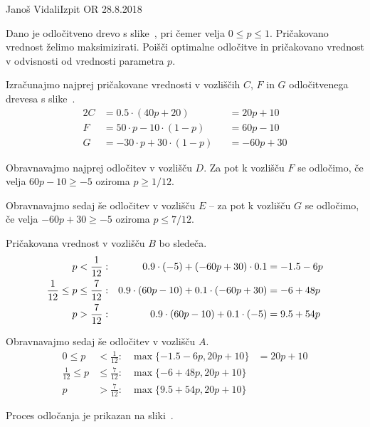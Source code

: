 \begin{naloga}{Janoš Vidali}{Izpit OR 28.8.2018}
\begin{vprasanje}
Dano je odločitveno drevo s slike~\fig,
pri čemer velja $0 \le p \le 1$.
Pričakovano vred\-nost želimo maksimizirati.
Poišči optimalne odločitve in pričakovano vrednost
v odvisnosti od vrednosti parametra $p$.

\begin{slika}
\pgfslika
{}
\end{slika}
\end{vprasanje}

\begin{odgovor}
Izračunajmo najprej pričakovane vrednosti v vozliščih $C$, $F$ in $G$
odločitvenega drevesa s slike~\fig.
\begin{alignat*}{2}
C &= 0.5 \cdot (40 p + 20) &&= 20p + 10 \\
F &= 50 \cdot p - 10 \cdot (1-p) &&= 60 p - 10 \\
G &= - 30 \cdot p + 30 \cdot (1-p) &&=  -60p + 30
\end{alignat*}

Obravnavajmo najprej odločitev v vozlišču $D$.
Za pot k vozlišču $F$ se odločimo,
če velja $60p - 10 \ge -5$ oziroma $p \ge 1/12$.

Obravnavajmo sedaj še odločitev v vozlišču $E$
-- za pot k vozlišču $G$ se odločimo,
če velja $-60p + 30 \ge -5$ oziroma $p \le 7/12$.

Pričakovana vrednost v vozlišču $B$ bo sledeča.
\begin{align*}
p &< {1 \over 12}: & 0.9 \cdot (-5) + (-60p + 30) \cdot 0.1 &= -1.5 - 6p \\
\frac{1}{12} \leq p &\le \frac{7}{12}: &
0.9 \cdot (60p - 10) + 0.1 \cdot (-60p + 30) &= -6 + 48p \\
p &> \frac{7}{12}: & 0.9 \cdot (60p - 10) + 0.1 \cdot (-5) &= 9.5 + 54 p
\end{align*}

Obravnavajmo sedaj še odločitev v vozlišču $A$.
\begin{align*}
0 \leq p &< \frac{1}{12}: & \max \{ -1.5 - 6p, 20p + 10 \} &= 20p + 10 \\
\frac{1}{12} \leq p &\le \frac{7}{12} : & \max \{ -6 + 48p, 20p + 10 \} \\
p &> \frac{7}{12} : & \max \{ 9.5 + 54p, 20p + 10 \}
\end{align*}

Proces odločanja je prikazan na sliki~.

\begin{slika}
\end{slika}


\end{odgovor}
\end{naloga}
